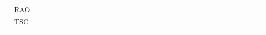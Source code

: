 \begin{landscape}
\begin{table*}
\begin{tabular}{|c|l|c|c|c|c|c|c|c|c|c|c|c|c|c|c|c|c|c|c|c|c|c|c|c|c|c|c|c|c|c|c|c|c|c|}
 & RAO            & & & & & & & & & & & & & & & & & & & & & & & & & & & & & & & & & \\ \cline{2-35}

 & TSC            & & & & & & & & & & & & & & & & & & & & & & & & & & & & & & & & & \\ \Xhline{2\arrayrulewidth}


\end{tabular}
\caption{
}
\label{table:cmp-mms}
\end{table*}

\end{landscape}

\twocolumn

